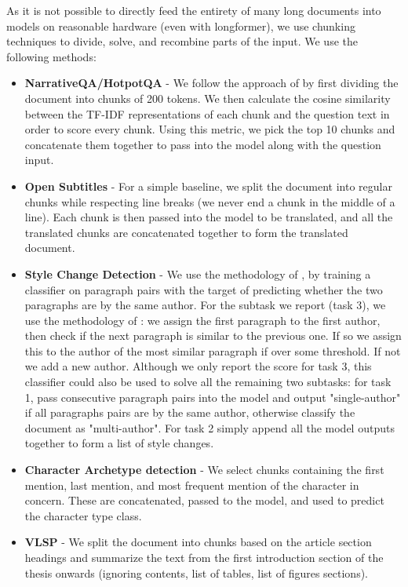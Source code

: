 \documentclass[10pt, a4paper]{article}
\begin{document}
As it is not possible to directly feed the entirety of many long documents into models on reasonable hardware (even with longformer), we use chunking techniques to divide, solve, and recombine parts of the input. We use the following methods:
\begin{itemize}
    \item\textbf{NarrativeQA/HotpotQA} - We follow the approach of  by first dividing the document into chunks of 200 tokens. We then calculate the cosine similarity between the TF-IDF representations of each chunk and the question text in order to score every chunk. Using this metric, we pick the top 10 chunks and concatenate them together to pass into the model along with the question input.
    \item\textbf{Open Subtitles} - For a simple baseline, we split the document into regular chunks while respecting line breaks (we never end a chunk in the middle of a line). Each chunk is then passed into the model to be translated, and all the translated chunks are concatenated together to form the translated document.
    \item\textbf{Style Change Detection} - We use the methodology of , by training a classifier on paragraph pairs with the target of predicting whether the two paragraphs are by the same author. For the subtask we report (task 3), we use the methodology of : we assign the first paragraph to the first author, then check if the next paragraph is similar to the previous one. If so we assign this to the author of the most similar paragraph if over some threshold. If not we add a new author. Although we only report the score for task 3, this classifier could also be used to solve all the remaining two subtasks: for task 1, pass consecutive paragraph pairs into the model and output "single-author" if all paragraphs pairs are by the same author, otherwise classify the document as "multi-author". For task 2 simply append all the model outputs together to form a list of style changes. 
    \item\textbf{Character Archetype detection} - We select chunks containing the first mention, last mention, and most frequent mention of the character in concern. These are concatenated, passed to the model, and used to predict the character type class.
    \item\textbf{VLSP} - We split the document into chunks based on the article section headings and summarize the text from the first introduction section of the thesis onwards (ignoring contents, list of tables, list of figures sections).
\end{itemize}
\end{document}
